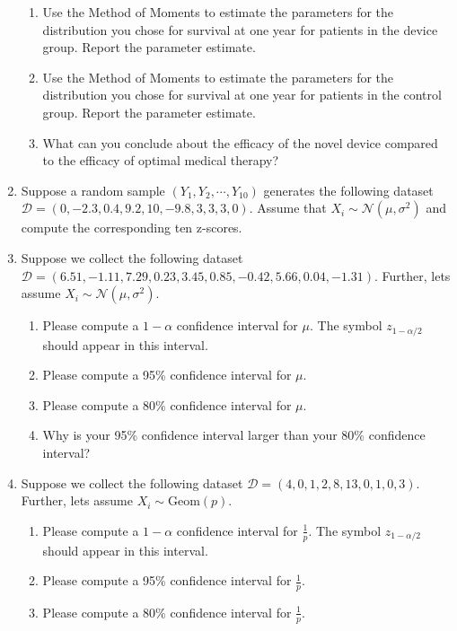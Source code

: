 \begin{enumerate}
\begin{enumerate}
        \item Use the Method of Moments to estimate the parameters for the distribution you chose for survival at one year for patients in the device group. Report the parameter estimate. 
        
        \item Use the Method of Moments to estimate the parameters for the distribution you chose for survival at one year for patients in the control group. Report the parameter estimate. 
        
        \item What can you conclude about the efficacy of the novel device compared to the efficacy of optimal medical therapy?   
        
    \end{enumerate}
    
    \item Suppose a random sample $(Y_{1},Y_{2},\cdots,Y_{10})$ generates the following dataset $\mathcal{D} = ( 0,-2.3,0.4,9.2,10,-9.8,3,3,3,0)$. Assume that $X_{i} \sim \mathcal{N}(\mu,\sigma^{2})$ and compute the corresponding ten z-scores. 
    
    \item Suppose we collect the following dataset $\mathcal{D} = ( 6.51, -1.11,  7.29,  0.23,  3.45,  0.85, -0.42,  5.66,  0.04, -1.31 )$. Further, lets assume $X_{i} \sim \mathcal{N}(\mu,\sigma^{2})$.
    \begin{enumerate}
        \item Please compute a $1-\alpha$ confidence interval for $\mu$. The symbol $z_{1-\alpha/2}$ should appear in this interval. 
        \item Please compute a 95\% confidence interval for $\mu$.
        \item Please compute a 80\% confidence interval for $\mu$.
        \item Why is your 95\% confidence interval larger than your 80\% confidence interval?
    \end{enumerate}
    
    \item Suppose we collect the following dataset $\mathcal{D} = (4, 0,  1, 2, 8, 13, 0, 1, 0, 3)$. Further, lets assume $X_{i} \sim \text{Geom}(p)$.
        \begin{enumerate}
            \item Please compute a $1-\alpha$ confidence interval for $\frac{1}{p}$. The symbol $z_{1-\alpha/2}$ should appear in this interval. 
            \item Please compute a 95\% confidence interval for $\frac{1}{p}$.
            \item Please compute a 80\% confidence interval for $\frac{1}{p}$.
        \end{enumerate}
        

\end{enumerate}
